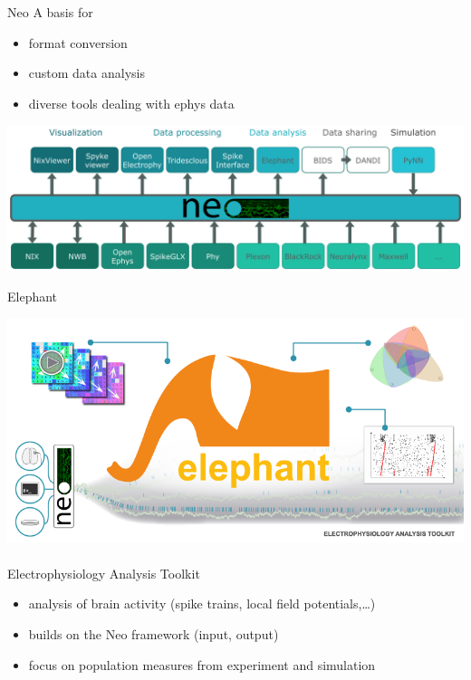 \documentclass[pdftex]{beamer}
\begin{document}
\begin{frame}{Neo}
    A basis for
    \begin{itemize}
        \item format conversion
        \item custom data analysis
        \item diverse tools dealing with ephys data
    \end{itemize}
    \vspace{1ex}
    \includegraphics[width=\textwidth]{resources/neo_as_interface.png}
\end{frame}


\begin{frame}{Elephant}
    \begin{center}
    \includegraphics[width=.7\textwidth]{resources/elephant_teaser.png}\\
    \ \\
    Electrophysiology Analysis Toolkit
    \begin{itemize}
        \item analysis of brain activity (spike trains, local field potentials,\dots)
        \item builds on the Neo framework (input, output)
        \item focus on population measures from experiment and simulation
    \end{itemize}
    \end{center}
\end{frame}
\end{document}
